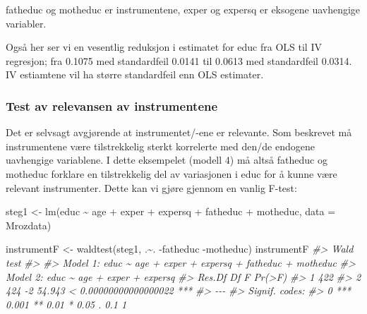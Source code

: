 \documentclass[
]{article}
\newenvironment{Shaded}{\begin{snugshade}}{\end{snugshade}}
\newcommand{\AttributeTok}[1]{\textcolor[rgb]{0.77,0.63,0.00}{#1}}
\newcommand{\CommentTok}[1]{\textcolor[rgb]{0.56,0.35,0.01}{\textit{#1}}}
\newcommand{\FunctionTok}[1]{\textcolor[rgb]{0.00,0.00,0.00}{#1}}
\newcommand{\NormalTok}[1]{#1}
\newcommand{\OtherTok}[1]{\textcolor[rgb]{0.56,0.35,0.01}{#1}}
\newcommand{\SpecialCharTok}[1]{\textcolor[rgb]{0.00,0.00,0.00}{#1}}
\begin{document}
fatheduc og motheduc er instrumentene, exper og expersq er eksogene uavhengige variabler.

Også her ser vi en vesentlig reduksjon i estimatet for educ fra OLS til IV regresjon; fra 0.1075 med standardfeil 0.0141 til 0.0613 med standardfeil 0.0314. IV estiamtene vil ha større standardfeil enn OLS estimater.

\hypertarget{test-av-relevansen-av-instrumentene}{%
\subsubsection{Test av relevansen av instrumentene}\label{test-av-relevansen-av-instrumentene}}

Det er selvsagt avgjørende at instrumentet/-ene er relevante. Som beskrevet må instrumentene være tilstrekkelig sterkt korrelerte med den/de endogene uavhengige variablene. I dette eksempelet (modell 4) må altså fatheduc og motheduc forklare en tilstrekkelig del av variasjonen i educ for å kunne være relevant instrumenter. Dette kan vi gjøre gjennom en vanlig F-test:

\begin{Shaded}
\begin{Highlighting}[]
\NormalTok{steg1 }\OtherTok{\textless{}{-}} \FunctionTok{lm}\NormalTok{(educ }\SpecialCharTok{\textasciitilde{}}\NormalTok{ age }\SpecialCharTok{+}\NormalTok{ exper }\SpecialCharTok{+}\NormalTok{ expersq }\SpecialCharTok{+}\NormalTok{ fatheduc }\SpecialCharTok{+}\NormalTok{ motheduc, }\AttributeTok{data =}\NormalTok{ Mrozdata)}

\NormalTok{instrumentF }\OtherTok{\textless{}{-}} \FunctionTok{waldtest}\NormalTok{(steg1, .}\SpecialCharTok{\textasciitilde{}}\NormalTok{. }\SpecialCharTok{{-}}\NormalTok{fatheduc }\SpecialCharTok{{-}}\NormalTok{motheduc)}
\NormalTok{instrumentF}
\CommentTok{\#\textgreater{} Wald test}
\CommentTok{\#\textgreater{} }
\CommentTok{\#\textgreater{} Model 1: educ \textasciitilde{} age + exper + expersq + fatheduc + motheduc}
\CommentTok{\#\textgreater{} Model 2: educ \textasciitilde{} age + exper + expersq}
\CommentTok{\#\textgreater{}   Res.Df Df      F                Pr(\textgreater{}F)    }
\CommentTok{\#\textgreater{} 1    422                                    }
\CommentTok{\#\textgreater{} 2    424 {-}2 54.943 \textless{} 0.00000000000000022 ***}
\CommentTok{\#\textgreater{} {-}{-}{-}}
\CommentTok{\#\textgreater{} Signif. codes:  }
\CommentTok{\#\textgreater{} 0 \textquotesingle{}***\textquotesingle{} 0.001 \textquotesingle{}**\textquotesingle{} 0.01 \textquotesingle{}*\textquotesingle{} 0.05 \textquotesingle{}.\textquotesingle{} 0.1 \textquotesingle{} \textquotesingle{} 1}
\end{Highlighting}
\end{Shaded}
\end{document}
